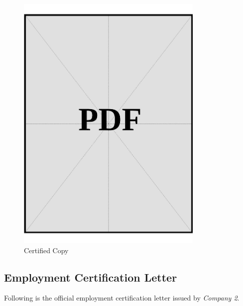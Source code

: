 \begin{figure}[ht]
  \centering
  \includegraphics[page=1, width=0.8\textwidth]{../docs/applicant/employment/company-2/insurance-records/certified-copies.pdf}
  \caption{Certified Copy}
  \label{pdf:company-2-insurance-certified-copy}
\end{figure}
\vspace*{\fill}

\clearpage

\subsection*{Employment Certification Letter}\label{ssec:company-2-certificate}


Following is the official employment certification letter issued by \textit{Company 2}.

